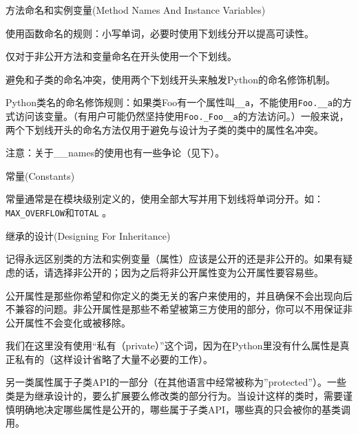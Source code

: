 \documentclass[ignorenonframetext,9pt]{beamer}
\begin{document}
\begin{frame}[fragile]
\begin{block}{方法命名和实例变量(Method Names And Instance Variables)}

使用函数命名的规则：小写单词，必要时使用下划线分开以提高可读性。

仅对于非公开方法和变量命名在开头使用一个下划线。

避免和子类的命名冲突，使用两个下划线开头来触发Python的命名修饰机制。

Python类名的命名修饰规则：如果类Foo有一个属性叫\texttt{\_\_a}，不能使用\texttt{Foo.\_\_a}的方式访问该变量。（有用户可能仍然坚持使用\texttt{Foo.\_Foo\_\_a}的方法访问。）一般来说，两个下划线开头的命名方法仅用于避免与设计为子类的类中的属性名冲突。

注意：关于\_\_names的使用也有一些争论（见下）。

\end{block}
\begin{block}{常量(Constants)}

常量通常是在模块级别定义的，使用全部大写并用下划线将单词分开。如：\texttt{MAX\_OVERFLOW}和\texttt{TOTAL}
。

\end{block}

\end{frame}
\begin{frame}[fragile]

\begin{block}{继承的设计(Designing For Inheritance)}

记得永远区别类的方法和实例变量（属性）应该是公开的还是非公开的。如果有疑虑的话，请选择非公开的；因为之后将非公开属性变为公开属性要容易些。

公开属性是那些你希望和你定义的类无关的客户来使用的，并且确保不会出现向后不兼容的问题。非公开属性是那些不希望被第三方使用的部分，你可以不用保证非公开属性不会变化或被移除。

我们在这里没有使用``私有（private）''这个词，因为在Python里没有什么属性是真正私有的（这样设计省略了大量不必要的工作）。

另一类属性属于子类API的一部分（在其他语言中经常被称为''protected''）。一些类是为继承设计的，要么扩展要么修改类的部分行为。当设计这样的类时，需要谨慎明确地决定哪些属性是公开的，哪些属于子类API，哪些真的只会被你的基类调用。

\end{block}

\end{frame}
\end{document}
